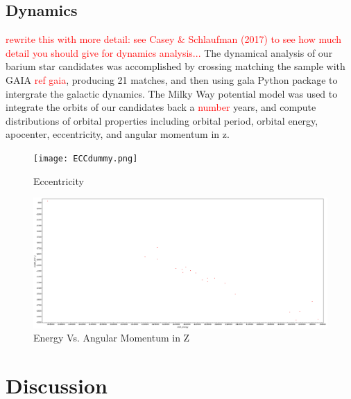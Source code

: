 \documentclass[a4paper,fleqn,usenatbib]{mnras}
\newcommand{\todo}[1]{\textcolor{red}{#1}}
\begin{document}

\subsection{Dynamics}
\todo{rewrite this with more detail: see Casey \& Schlaufman (2017) to see how much detail you should give for dynamics analysis...}
The dynamical analysis of our barium star candidates was accomplished by crossing matching the sample with GAIA \todo{ref gaia}, producing 21 matches, and then using gala Python package to intergrate the galactic dynamics. The Milky Way potential model was used to integrate the orbits of our candidates back a \todo{number} years, and compute distributions of orbital properties including orbital period, orbital energy, apocenter, eccentricity, and angular momentum in z.

\begin{figure}
	\texttt{[image: ECCdummy.png]}
    \caption{Eccentricity}
    \label{fig:figure3}
\end{figure}

\begin{figure}
	\includegraphics[width=\columnwidth]{energy_angmomz.png}
    \caption{Energy Vs. Angular Momentum in Z}
    \label{fig:figure3}
\end{figure}

\section{Discussion}  \label{sec:dis}
\end{document}
